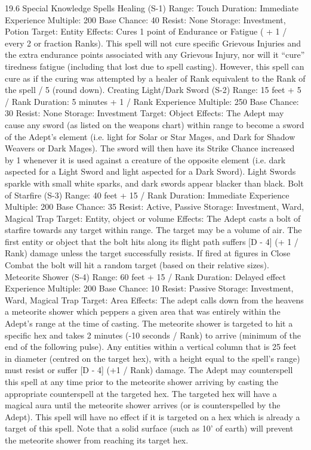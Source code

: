 \documentclass[a4paper]{article}
\begin{document}
\begin{multicols}{3}
19.6 Special Knowledge Spells
Healing (S-1)
Range: Touch
Duration: Immediate
Experience Multiple: 200
Base Chance: 40%
Resist: None
Storage: Investment, Potion
Target: Entity
Effects: Cures 1 point of Endurance or Fatigue ( +
1 / every 2 or fraction Ranks). This spell will not
cure specific Grievous Injuries and the extra endurance points associated with any Grievous Injury, nor will it “cure” tiredness fatigue (including
that lost due to spell casting). However, this spell
can cure as if the curing was attempted by a healer
of Rank equivalent to the Rank of the spell / 5
(round down).
Creating Light/Dark Sword (S-2)
Range: 15 feet + 5 / Rank
Duration: 5 minutes + 1 / Rank
Experience Multiple: 250
Base Chance: 30%
Resist: None
Storage: Investment
Target: Object
Effects: The Adept may cause any sword (as listed
on the weapons chart) within range to become a
sword of the Adept’s element (i.e. light for Solar or
Star Mages, and Dark for Shadow Weavers or
Dark Mages). The sword will then have its Strike
Chance increased by 1%
whenever it is used against a creature of the opposite element (i.e. dark aspected for a Light Sword
and light aspected for a Dark Sword). Light
Swords sparkle with small white sparks, and dark
swords appear blacker than black.
Bolt of Starfire (S-3)
Range: 40 feet + 15 / Rank
Duration: Immediate
Experience Multiple: 200
Base Chance: 35%
Resist: Active, Passive
Storage: Investment, Ward, Magical Trap
Target: Entity, object or volume
Effects: The Adept casts a bolt of starfire towards
any target within range. The target may be a volume of air. The first entity or object that the bolt
hits along its flight path suffers [D - 4] (+ 1 / Rank)
damage unless the target successfully resists. If
fired at figures in Close Combat the bolt will hit a
random target (based on their relative sizes).
Meteorite Shower (S-4)
Range: 60 feet + 15 / Rank
Duration: Delayed effect
Experience Multiple: 200
Base Chance: 10%
Resist: Passive
Storage: Investment, Ward, Magical Trap
Target: Area
Effects: The adept calls down from the heavens a
meteorite shower which peppers a given area that
was entirely within the Adept’s range at the time of
casting. The meteorite shower is targeted to hit a
specific hex and takes 2 minutes (-10 seconds /
Rank) to arrive (minimum of the end of the following pulse). Any entities within a vertical column
that is 25 feet in diameter (centred on the target
hex), with a height equal to the spell’s range) must
resist or suffer [D - 4] (+1 / Rank) damage. The
Adept may counterspell this spell at any time prior
to the meteorite shower arriving by casting the
appropriate counterspell at the targeted hex. The
targeted hex will have a magical aura until the
meteorite shower arrives (or is counterspelled by
the Adept). This spell will have no effect if it is
targeted on a hex which is already a target of this
spell. Note that a solid surface (such as 10’ of
earth) will prevent the meteorite shower from
reaching its target hex.


\end{multicols}
\end{document}
